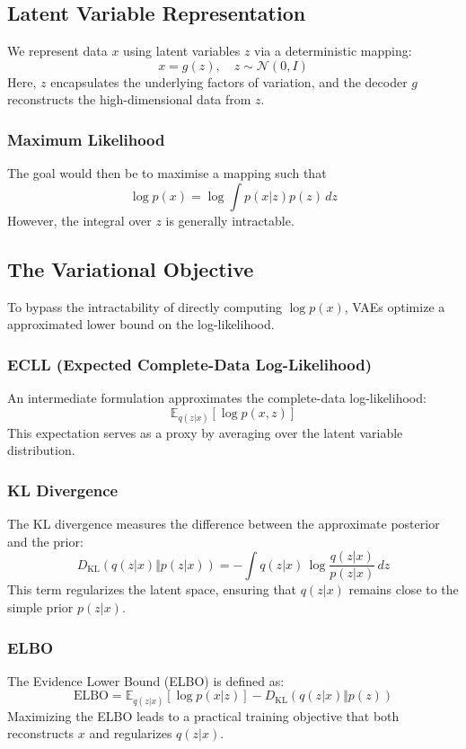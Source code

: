 \documentclass{article}
\begin{document}
\subsection{Latent Variable Representation}
We represent data \(x\) using latent variables \(z\) via a deterministic mapping:
\[
x = g(z), \quad z \sim \mathcal{N}(0, I)
\]
Here, \(z\) encapsulates the underlying factors of variation, and the decoder \(g\) reconstructs the high-dimensional data from \(z\).

\subsubsection{Maximum Likelihood}
The goal would then be to maximise a mapping such that
\[
\log p(x) = \log \int p(x|z)p(z)\,dz
\]
However, the integral over \(z\) is generally intractable.

\subsection{The Variational Objective}
To bypass the intractability of directly computing \(\log p(x)\), VAEs optimize a approximated lower bound on the log-likelihood.

\subsubsection{ECLL (Expected Complete-Data Log-Likelihood)}
An intermediate formulation approximates the complete-data log-likelihood:
\[
\mathbb{E}_{q(z|x)}[\log p(x,z)]
\]
This expectation serves as a proxy by averaging over the latent variable distribution.

\subsubsection{KL Divergence}
The KL divergence measures the difference between the approximate posterior and the prior:
\[
D_{\text{KL}}(q(z|x) \Vert p(z|x)) = -\int q(z|x)\,\log \frac{q(z|x)}{p(z|x)} \,dz
\]
This term regularizes the latent space, ensuring that \(q(z|x)\) remains close to the simple prior \(p(z|x)\).

\subsubsection{ELBO}
The Evidence Lower Bound (ELBO) is defined as:
\[
\text{ELBO} = \mathbb{E}_{q(z|x)}[\log p(x|z)] - D_{\text{KL}}(q(z|x) \Vert p(z))
\]
Maximizing the ELBO leads to a practical training objective that both reconstructs \(x\) and regularizes \(q(z|x)\).
\end{document}

